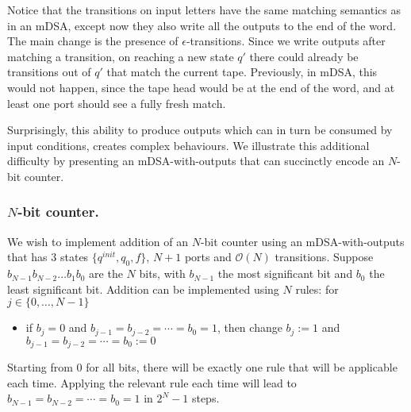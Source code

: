 Notice that the transitions on input letters have the same matching semantics as in an mDSA, except now they also write all the outputs to the end of the word. The main change is the presence of $\epsilon$-transitions. Since we write outputs after matching a transition, on reaching a new state $q'$ there could already be transitions out of $q'$ that match the current tape. Previously, in mDSA, this would not happen, since the tape head would be at the end of the word, and at least one port should see a fully fresh match. %

Surprisingly, this ability to produce outputs which can in turn be consumed by input conditions, creates complex behaviours.  We illustrate this additional difficulty by presenting an mDSA-with-outputs that can succinctly encode an $N$-bit counter.

\subsubsection*{$N$-bit counter.} We wish to implement addition of an $N$-bit counter using an mDSA-with-outputs that has $3$ states $\{q^{init}, q_0, f\}$, $N+1$ ports and $\mathcal{O}(N)$ transitions. Suppose $b_{N-1} b_{N-2} \dots b_1 b_0$ are the $N$ bits, with $b_{N-1}$ the most significant bit and $b_0$ the least significant bit. Addition can be implemented using $N$ rules: for $j \in \{0, \dots, N-1\}$
\begin{itemize}
\item if $b_j = 0$ and $b_{j-1} = b_{j-2} = \cdots = b_0 = 1$, then change $b_j:= 1$ and $b_{j-1} = b_{j-2} = \cdots = b_0 := 0$
\end{itemize}
Starting from $0$ for all bits, there will be exactly one rule that will be applicable each time. Applying the relevant rule each time will lead to $b_{N-1} = b_{N-2} = \cdots = b_0 = 1$ in $2^N - 1$ steps.

